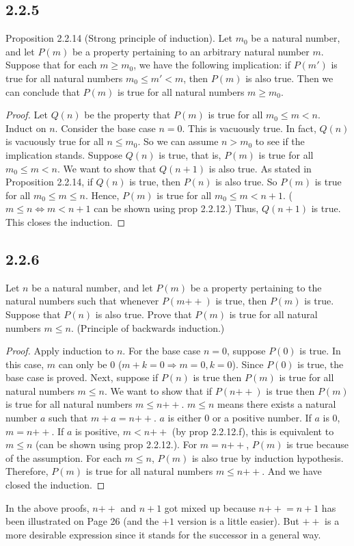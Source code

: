 \documentclass[12pt, letter]{article}
\begin{document}
\subsection*{2.2.5}
Proposition 2.2.14 (Strong principle of induction). Let $m_0$ be a natural number, and let $P(m)$ be a property pertaining to an arbitrary natural 
number $m$. Suppose that for each $m\geq m_0$, we have the following implication: if $P(m')$ is true for all natural numbers $m_0\leq m'<m$, then $P(m)$ is also true.
Then we can conclude that $P(m)$ is true for all natural numbers $m\geq m_0$.
\begin{proof}
    Let $Q(n)$ be the property that $P(m)$ is true for all $m_0\leq m<n$. Induct on $n$. 
    Consider the base case $n=0$. This is vacuously true. In fact, $Q(n)$ is vacuously true for all $n \leq m_0$. So we can assume $n>m_0$ to see if the implication stands. Suppose $Q(n)$ is true, that is, $P(m)$ is true for all $m_0\leq m<n$. 
    We want to show that $Q(n+1)$ is also true. As stated in Proposition 2.2.14, if $Q(n)$ is true, then $P(n)$ is also true. 
    So $P(m)$ is true for all $m_0\leq m\leq n$. Hence, $P(m)$ is true for all $m_0\leq m<n+1$. ($m\leq n \Leftrightarrow m<n+1$ can be shown using prop 2.2.12.) Thus, $Q(n+1)$ is true. This closes the induction.
\end{proof}
\subsection*{2.2.6}
Let $n$ be a natural number, and let $P(m)$ be a property pertaining to the natural numbers such that whenever $P(m\mathtt{++})$ is true, then $P(m)$
is true. Suppose that $P(n)$ is also true. Prove that $P(m)$ is true for all natural numbers $m\leq n$. (Principle of backwards induction.)
\begin{proof}
    Apply induction to $n$. For the base case $n=0$, suppose $P(0)$ is true. In this case, $m$ can only be 0 ($m+k=0 \Rightarrow m=0,k=0$). Since $P(0)$ is true, 
    the base case is proved. Next, suppose if $P(n)$ is true then $P(m)$ is true for all natural numbers $m\leq n$. We want to show that if $P(n\mathtt{++})$ is true then $P(m)$ is true for all 
    natural numbers $m\leq n\mathtt{++}$. $m\leq n$ means there exists a natural number $a$ such that $m+a=n\mathtt{++}$. $a$ is either 0 or a positive number. If $a$ is 0, $m=n\mathtt{++}$. If $a$ is positive, $m<n\mathtt{++}$ (by prop 2.2.12.f), this is equivalent to $m\leq n$ (can be shown using prop 2.2.12.). 
    For $m=n\mathtt{++}$, $P(m)$ is true because of the assumption. For each $m\leq n$, $P(m)$ is also true by induction hypothesis. Therefore, $P(m)$ is true for all natural numbers $m\leq n\mathtt{++}$. And we have closed the induction.
\end{proof}
In the above proofs, $n\mathtt{++}$ and $n+1$ got mixed up because $n\mathtt{++}=n+1$ has been illustrated on Page 26 (and the $+1$ version is a little easier). But $\mathtt{++}$ is a more desirable expression since it stands for the successor in a general way.
\end{document}
